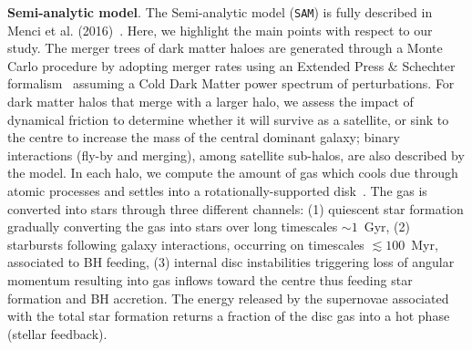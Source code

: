 \documentclass{natureprintstyle}
\newcommand{\sam}{\texttt{SAM}}
\begin{document}
\textbf{Semi-analytic model}. The Semi-analytic model (\sam) is fully described in Menci et al. (2016)~\cite{Menci2016}. Here, we highlight the main points with respect to our study. The merger trees of dark matter haloes are generated through a Monte Carlo procedure by adopting merger rates using an Extended Press \& Schechter formalism~\cite{Lacey1993} assuming a Cold Dark Matter power spectrum of perturbations. For dark matter halos  that merge with a larger halo, we assess the impact of dynamical friction to determine whether it will survive as a satellite, or sink to the centre to increase the mass of the central dominant galaxy; binary interactions (fly-by and merging), among satellite sub-halos, are also described by the model. In each halo, we compute the amount of gas which cools due through atomic processes and settles into a rotationally-supported disk~\cite{Mo1998}. The gas is converted into stars through three different channels: (1) quiescent star formation gradually converting the gas into stars over long timescales $\sim 1$~Gyr, (2) starbursts following galaxy interactions, occurring on timescales $\lesssim 100$~Myr, associated to BH feeding, (3) internal disc instabilities triggering loss of angular momentum resulting into gas inflows toward the centre thus feeding star formation and BH accretion. The energy released by the supernovae associated with the total star formation returns a fraction of the disc gas into a hot phase (stellar feedback). 
\end{document}
